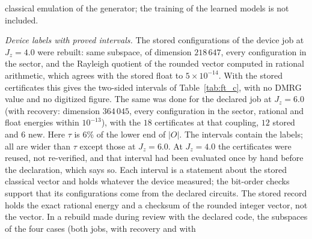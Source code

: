 \documentclass[aps,prx,onecolumn,10pt,nofootinbib,longbibliography,floatfix]{revtex4-2}
\theoremstyle{remark}
\newcommand{\Jz}{J_z}
\begin{document}
classical emulation of the generator; the training of the learned models is not included.
\def\SMcap{Mean miss on disordered lattices at $n=57$ over six instances and $121$ labels, in units of $6\%$ of the mean absolute label of each type.}\def\SMlab{tab:ft_b} %

\needspace{150pt}%
\def\SMcap{Miss per test instance on disordered lattices, same units as Table~\ref{tab:ft_b}.}\def\SMlab{tab:ft_b_inst}


\emph{Device labels with proved intervals.} The stored configurations of the device job at $\Jz=4.0$ were rebuilt: same
subspace, of dimension $218\,647$, every configuration in the sector, and the Rayleigh quotient of the rounded vector %
computed in rational arithmetic, which agrees with the stored float to $5\times10^{-14}$. With the stored certificates %
this gives the two-sided intervals of Table~\ref{tab:ft_c}, with no DMRG value and no digitized figure. The same was
done for the declared job at $\Jz=6.0$ (with recovery: dimension $364\,045$, every configuration in the sector, rational and float %
energies within $10^{-13}$), with the $18$ certificates at that coupling, $12$ stored and $6$ new. Here $\tau$ is $6\%$ %
of the lower end of $|O|$. The intervals contain the labels; all are wider than $\tau$ except those at $\Jz=6.0$. At %
$\Jz=4.0$ the certificates were reused, not re-verified, and that interval had been evaluated once by hand before the %
declaration, which says so. Each interval is a statement about the stored classical vector and holds whatever the
device measured; the bit-order checks support that its configurations come from the declared circuits. The stored
record holds the exact rational energy and a checksum of the rounded integer vector, not the vector. In a rebuild
made during review with the declared code, the subspaces of the four cases (both jobs, with recovery and with
\end{document}
